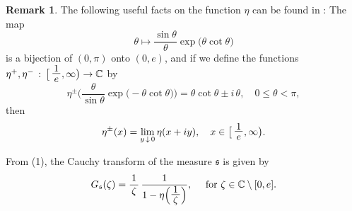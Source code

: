 \documentclass[12pt]{amsart}
\theoremstyle{definition}
\newtheorem{rem}[thm]{Remark}
\numberwithin{equation}{section}
\begin{document}
\noindent
\begin{rem}
The following useful facts on the function $\eta$ can be found 
in \cite[Sect.2]{DyHa04}:
The map 
$$
 \theta \longmapsto \frac{\sin \theta}{\theta} 
                    \exp \big( \theta \cot \theta \big)
$$
is a bijection of $(0, \pi)$ onto $(0, e)$, and if we 
define the functions 
$\eta^{+}, \eta^{-}  \, : \, 
\big[ \, \mbox{\Large $\frac{1}{\, e \,}$}, \infty \big) 
\rightarrow {\mathbb C}$ by 
$$
  \eta^{\pm} \Big(  
                   \frac{\theta}{\sin \theta}
                   \exp \big( - \theta \cot \theta \big) \Big)
  = \theta \cot \theta \pm i \, \theta,
   \quad 0 \le \theta < \pi,
$$
then 
$$
    \eta^{\pm} (x) = \lim_{y \, \downarrow \, 0} \eta (x + i y),
    \quad x \in \big[ \, \mbox{\Large $\frac{1}{\, e \,}$}, \infty \big).
$$
\end{rem}

From (1), the Cauchy transform of the measure ${\mathfrak{s}}$ is given by 
$$
   G_{\mathfrak{s}} (\zeta) = 
    \frac{1}{\, \zeta \,} \, 
    \frac{1}{1 - \eta \Big( \mbox{\Large $\frac{1}{\, \zeta \,}$} \Big)},
\quad \mbox{ for } \zeta \in {\mathbb C} \setminus [0, e].
$$
\end{document}
